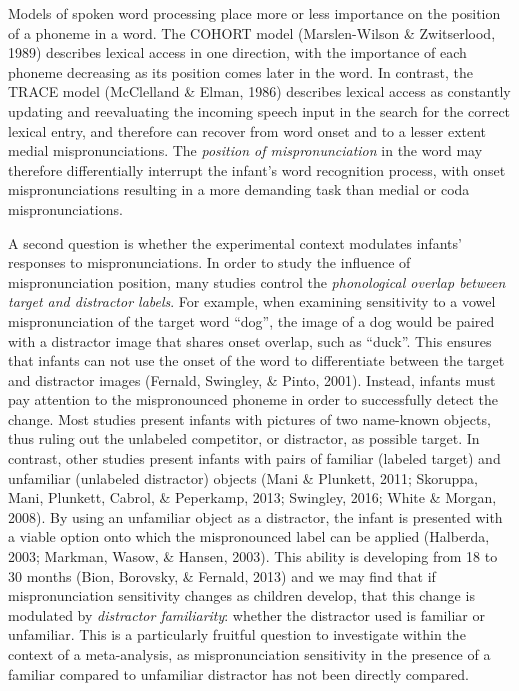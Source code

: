 \documentclass[man]{apa6}
\begin{document}
Models of spoken word processing place more or less importance on the position of a phoneme in a word. The COHORT model (Marslen-Wilson \& Zwitserlood, 1989) describes lexical access in one direction, with the importance of each phoneme decreasing as its position comes later in the word. In contrast, the TRACE model (McClelland \& Elman, 1986) describes lexical access as constantly updating and reevaluating the incoming speech input in the search for the correct lexical entry, and therefore can recover from word onset and to a lesser extent medial mispronunciations. The \emph{position of mispronunciation} in the word may therefore differentially interrupt the infant's word recognition process, with onset mispronunciations resulting in a more demanding task than medial or coda mispronunciations.

A second question is whether the experimental context modulates infants' responses to mispronunciations. In order to study the influence of mispronunciation position, many studies control the \emph{phonological overlap between target and distractor labels}. For example, when examining sensitivity to a vowel mispronunciation of the target word \enquote{dog}, the image of a dog would be paired with a distractor image that shares onset overlap, such as \enquote{duck}. This ensures that infants can not use the onset of the word to differentiate between the target and distractor images (Fernald, Swingley, \& Pinto, 2001). Instead, infants must pay attention to the mispronounced phoneme in order to successfully detect the change.
Most studies present infants with pictures of two name-known objects, thus ruling out the unlabeled competitor, or distractor, as possible target. In contrast, other studies present infants with pairs of familiar (labeled target) and unfamiliar (unlabeled distractor) objects (Mani \& Plunkett, 2011; Skoruppa, Mani, Plunkett, Cabrol, \& Peperkamp, 2013; Swingley, 2016; White \& Morgan, 2008). By using an unfamiliar object as a distractor, the infant is presented with a viable option onto which the mispronounced label can be applied (Halberda, 2003; Markman, Wasow, \& Hansen, 2003). This ability is developing from 18 to 30 months (Bion, Borovsky, \& Fernald, 2013) and we may find that if mispronunciation sensitivity changes as children develop, that this change is modulated by \emph{distractor familiarity}: whether the distractor used is familiar or unfamiliar. This is a particularly fruitful question to investigate within the context of a meta-analysis, as mispronunciation sensitivity in the presence of a familiar compared to unfamiliar distractor has not been directly compared.
\end{document}
